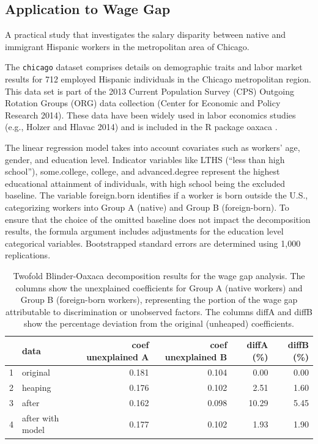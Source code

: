 \documentclass[12pt]{article}
\theoremstyle{plain}
\theoremstyle{definition}
\begin{document}
\subsection{Application to Wage Gap}\label{sec:wagegap}

A practical study that investigates the salary disparity between native and immigrant Hispanic workers in the metropolitan area of Chicago.

The \texttt{chicago} dataset comprises details on demographic traits and labor market results for 712 employed Hispanic individuals in the Chicago metropolitan region. This data set is part of the 2013 Current Population Survey (CPS) Outgoing Rotation Groups (ORG) data collection (Center for Economic and Policy Research 2014). These data have been widely used in labor economics studies (e.g., Holzer and Hlavac 2014) and is included in the R package oaxaca \citep{oaxaca}.


The linear regression model takes into account covariates such as workers' age, gender, and education level. Indicator variables like LTHS (``less than high school''), some.college, college, and advanced.degree represent the highest educational attainment of individuals, with high school being the excluded baseline. The variable foreign.born identifies if a worker is born outside the U.S., categorizing workers into Group A (native) and Group B (foreign-born). To ensure that the choice of the omitted baseline does not impact the decomposition results, the formula argument includes adjustments for the education level categorical variables. Bootstrapped standard errors are determined using 1,000 replications.

\begin{table}[!htp]
\centering
\begin{tabular}{rlrrrr}
  \hline
 & data & coef unexplained A & coef unexplained B & diffA (\%) & diffB (\%) \\
  \hline
1 & original & 0.181 & 0.104 & 0.00 & 0.00 \\
  2 & heaping & 0.176 & 0.102 & 2.51 & 1.60 \\
  3 & after & 0.162 & 0.098 & 10.29 & 5.45 \\
  4 & after with model & 0.177 & 0.102 & 1.93 & 1.90 \\
   \hline
\end{tabular}
\caption{Twofold Blinder-Oaxaca decomposition results for the wage gap analysis. The columns show the unexplained coefficients for Group A (native workers) and Group B (foreign-born workers), representing the portion of the wage gap attributable to discrimination or unobserved factors. The columns diffA and diffB show the percentage deviation from the original (unheaped) coefficients.}
\label{tab:twofold}
\end{table}
\end{document}

